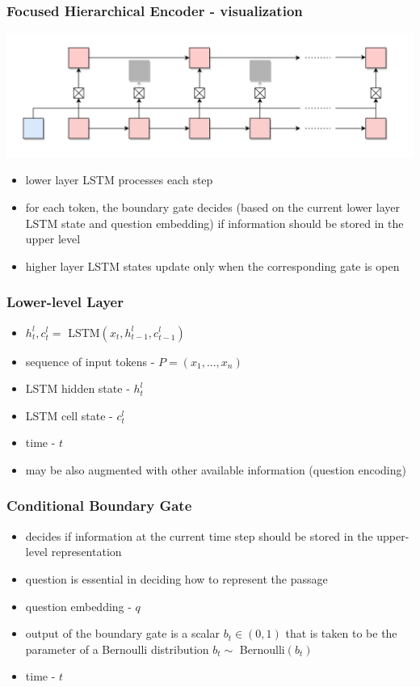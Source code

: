 \documentclass{beamer}
\begin{document}
\begin{frame}
    \frametitle{Focused Hierarchical Encoder - visualization}

    \begin{center}
        \includegraphics[scale=0.9]{img/FHE.png}
    \end{center}
    \begin{itemize}
        \item lower layer LSTM processes each step
        \item for each token, the boundary gate decides (based on the current lower layer LSTM state and question embedding) if information should be stored in the upper level
        \item higher layer LSTM states update only when the corresponding gate is open
    \end{itemize}
\end{frame}

\begin{frame}
    \frametitle{Lower-level Layer}
    \begin{itemize}
        \item $ h_t^l, c_t^l = $ LSTM$(x_t, h_{t-1}^l, c_{t-1}^l) $
        \item sequence of input tokens - $ P = (x_1, ..., x_n) $
        \item LSTM hidden state - $ h_t^l $
        \item LSTM cell state - $ c_t^l $
        \item time - $ t $
        \item may be also augmented with other available information (question encoding)
    \end{itemize}
\end{frame}

\begin{frame}
    \frametitle{Conditional Boundary Gate}
    \begin{itemize}
        \item decides if information at the current time step should be stored in the upper-level representation
        \item question is essential in deciding how to represent the passage
        \item question embedding - $ q $
        \item output of the boundary gate is a scalar $ b_t \in (0,1) $ that
is taken to be the parameter of a Bernoulli distribution $ b_t \sim $ Bernoulli$(b_t)$
        \item time - $ t $
    \end{itemize}
\end{frame}
\end{document}
